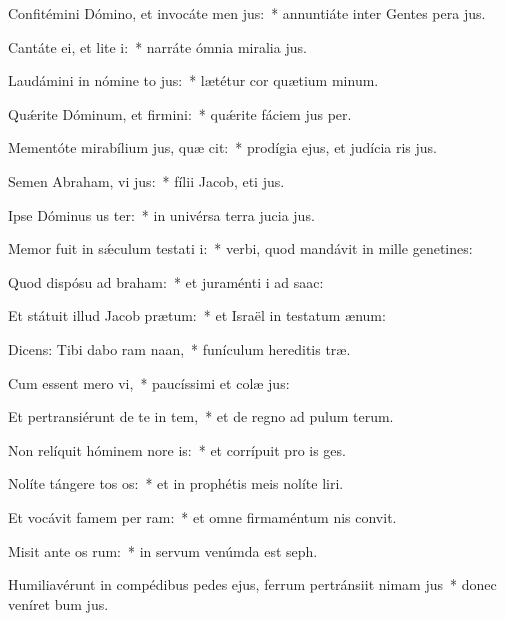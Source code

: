 \item Confitémini Dómino, et invocáte men jus:~* annuntiáte inter Gentes pera jus.
\item Cantáte ei, et lite i:~* narráte ómnia miralia jus.
\item Laudámini in nómine to jus:~* lætétur cor quætium minum.
\item Quǽrite Dóminum, et firmini:~* quǽrite fáciem jus per.
\item Mementóte mirabílium jus, quæ cit:~* prodígia ejus, et judícia ris jus.
\item Semen Abraham, vi jus:~* fílii Jacob, eti jus.
\item Ipse Dóminus us ter:~* in univérsa terra jucia jus.
\item Memor fuit in sǽculum testati i:~* verbi, quod mandávit in mille genetines:
\item Quod dispósu ad braham:~* et juraménti i ad saac:
\item Et státuit illud Jacob  prætum:~* et Israël in testatum ænum:
\item Dicens: Tibi dabo ram naan,~* funículum hereditis træ.
\item Cum essent mero vi,~* paucíssimi et colæ jus:
\item Et pertransiérunt de te in tem,~* et de regno ad pulum terum.
\item Non relíquit hóminem nore is:~* et corrípuit pro is ges.
\item Nolíte tángere tos os:~* et in prophétis meis nolíte liri.
\item Et vocávit famem per ram:~* et omne firmaméntum nis convit.
\item Misit ante os rum:~* in servum venúmda est seph.
\item Humiliavérunt in compédibus pedes ejus, ferrum pertránsiit nimam jus~* donec veníret bum jus.
